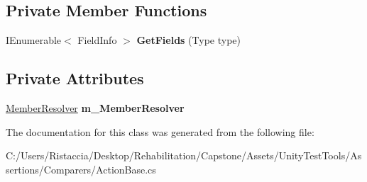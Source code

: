 \subsection*{Private Member Functions}
\begin{DoxyCompactItemize}
\item 
\mbox{\label{class_unity_test_1_1_action_base_aed2b3d7d3ddafbb97e3824df0781dd66}} 
I\+Enumerable$<$ Field\+Info $>$ {\bfseries Get\+Fields} (Type type)
\end{DoxyCompactItemize}
\subsection*{Private Attributes}
\begin{DoxyCompactItemize}
\item 
\mbox{\label{class_unity_test_1_1_action_base_a1e09be6c8136ef2131c69a923d6ce436}} 
\hyperlink{class_unity_test_1_1_member_resolver}{Member\+Resolver} {\bfseries m\+\_\+\+Member\+Resolver}
\end{DoxyCompactItemize}


The documentation for this class was generated from the following file\+:\begin{DoxyCompactItemize}
\item 
C\+:/\+Users/\+Ristaccia/\+Desktop/\+Rehabilitation/\+Capstone/\+Assets/\+Unity\+Test\+Tools/\+Assertions/\+Comparers/Action\+Base.\+cs\end{DoxyCompactItemize}
